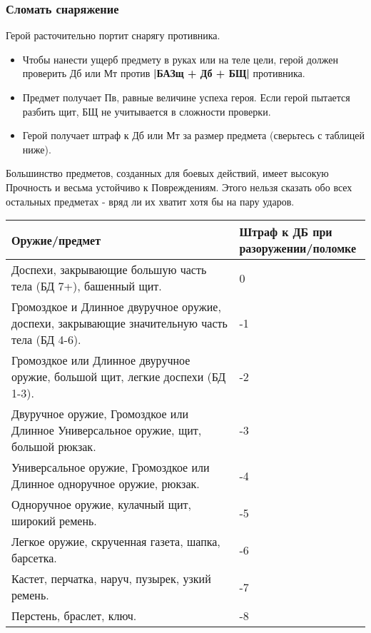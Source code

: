\subsubsection{Сломать снаряжение}
Герой расточительно портит снарягу противника.
\begin{itemize}
  \item Чтобы нанести ущерб предмету в руках или на теле цели, герой должен проверить Дб или Мт против \textbf{|БАЗщ + Дб + БЩ|} противника.
  \item Предмет получает Пв, равные величине успеха героя. Если герой пытается разбить щит, БЩ не учитывается в сложности проверки.
  \item Герой получает штраф к Дб или Мт за размер предмета (сверьтесь с таблицей ниже).
\end{itemize}
\begin{tcolorbox}
  Большинство предметов, созданных для боевых действий, имеет высокую Прочность и весьма устойчиво к Повреждениям. Этого нельзя сказать обо всех остальных предметах - вряд ли их хватит хотя бы на пару ударов.
\end{tcolorbox}

\begin{center} \begin{tabular}{|p{7cm}|p{3cm}|} \hline
  \textbf{Оружие/предмет} & \textbf{Штраф к ДБ при разоружении/поломке} \\ \hline
  Доспехи, закрывающие большую часть тела (БД 7+), башенный щит. & 0 \\ \hline
  Громоздкое и Длинное двуручное оружие, доспехи, закрывающие значительную часть тела (БД 4-6). & -1 \\ \hline
  Громоздкое или Длинное двуручное оружие, большой щит, легкие доспехи (БД 1-3). & -2 \\ \hline
  Двуручное оружие, Громоздкое или Длинное Универсальное оружие, щит, большой рюкзак. & -3 \\ \hline
  Универсальное оружие, Громоздкое или Длинное одноручное оружие, рюкзак. & -4 \\ \hline
  Одноручное оружие, кулачный щит, широкий ремень. & -5 \\ \hline
  Легкое оружие, скрученная газета, шапка, барсетка. & -6 \\ \hline
  Кастет, перчатка, наруч, пузырек, узкий ремень. & -7 \\ \hline
  Перстень, браслет, ключ. & -8 \\ \hline
\end{tabular} \end{center}

